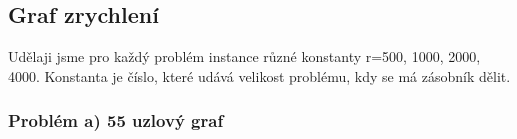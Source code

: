 \documentclass[11pt]{article}
\begin{document}





\newpage
\subsection{Graf zrychlení}
Udělaji jsme pro každý problém instance různé konstanty r=500, 1000, 2000, 4000. Konstanta je číslo, které udává velikost problému, kdy se má zásobník dělit.

\subsubsection{Problém a) 55 uzlový graf}
\end{document}
